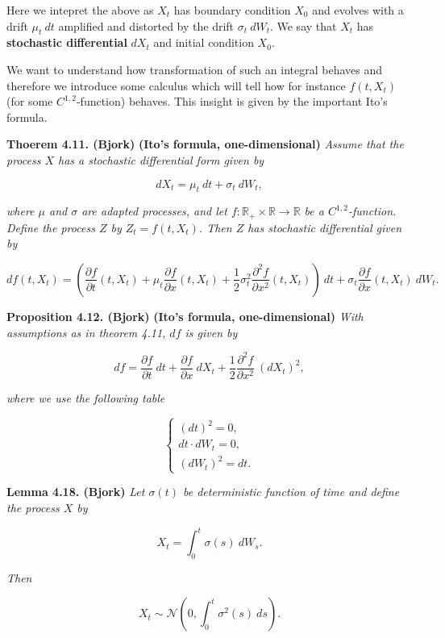 \documentclass[a4paper,12pt,openany]{book}
\begin{document}
Here we intepret the above as \(X_t\) has boundary condition \(X_0\) and evolves with a drift \(\mu_t\ dt\) amplified and distorted by the drift \(\sigma_t\ dW_t\). We say that \(X_t\) has \textbf{stochastic differential} \(dX_t\) and initial condition \(X_0\).

We want to understand how transformation of such an integral behaves and therefore we introduce some calculus which will tell how for instance \(f(t,X_t)\) (for some \(C^{1,2}\)-function) behaves. This insight is given by the important Ito's formula.

\textbf{Thoerem 4.11. (Bjork)} \textbf{(Ito's formula, one-dimensional)} \emph{Assume that the process \(X\) has a stochastic differential form given by}

\[
dX_t=\mu_t\ dt + \sigma_t\ dW_t,\tag{4.28}
\]

\emph{where \(\mu\) and \(\sigma\) are adapted processes, and let \(f:\mathbb{R}_+\times\mathbb{R}\to\mathbb{R}\) be a \(C^{1,2}\)-function. Define the process \(Z\) by \(Z_t=f(t,X_t)\). Then \(Z\) has stochastic differential given by}

\[
df(t,X_t)=\left(\frac{\partial f}{\partial t}(t,X_t) + \mu_t\frac{\partial f}{\partial x}(t,X_t) + \frac{1}{2}\sigma^2_t\frac{\partial^2 f}{\partial x^2}(t,X_t)\right)\ dt+\sigma_t\frac{\partial f}{\partial x}(t,X_t)\ dW_t.\tag{4.29}
\]

\textbf{Proposition 4.12. (Bjork)} \textbf{(Ito's formula, one-dimensional)} \emph{With assumptions as in theorem 4.11, \(df\) is given by}

\[
df=\frac{\partial f}{\partial t}\ dt + \frac{\partial f}{\partial x}\ dX_t + \frac{1}{2}\frac{\partial^2 f}{\partial x^2}\ (dX_t)^2,\tag{4.31}
\]

\emph{where we use the following table}

\[
\left\{\begin{matrix}(dt)^2=0,\\ dt\cdot dW_t=0,\\ (dW_t)^2=dt.\end{matrix}\right.
\]

\textbf{Lemma 4.18. (Bjork)} \emph{Let \(\sigma(t)\) be deterministic function of time and define the process \(X\) by}

\[
X_t=\int_0^t \sigma(s)\ dW_s.\tag{4.37}
\]

\emph{Then}

\[
X_t\sim\mathcal{N}\left(0,\int_0^t\sigma^2(s)\ ds\right).
\]
\end{document}
